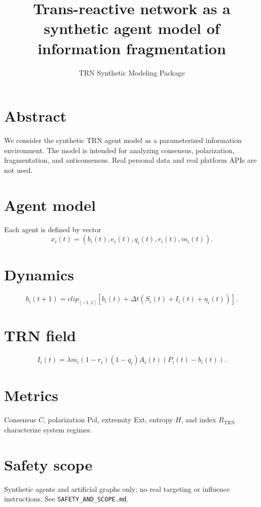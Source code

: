 \documentclass[12pt]{article}
\title{Trans-reactive network as a synthetic agent model of information fragmentation}
\author{TRN Synthetic Modeling Package}
\date{}
\begin{document}
\maketitle

\section{Abstract}
We consider the synthetic TRN agent model as a parameterized information environment. The model is intended for analyzing consensus, polarization, fragmentation, and anticonsensus. Real personal data and real platform APIs are not used.

\section{Agent model}
Each agent is defined by vector
\[
x_i(t)=(b_i(t),e_i(t),q_i(t),r_i(t),m_i(t)).
\]

\section{Dynamics}
\[
b_i(t+1)=clip_{[-1,1]}[b_i(t)+\Delta t(S_i(t)+I_i(t)+\eta_i(t))].
\]

\section{TRN field}
\[
I_i(t)=\lambda m_i(1-r_i)(1-q_i)A_i(t)(P_i(t)-b_i(t)).
\]

\section{Metrics}
Consensus $C$, polarization Pol, extremity Ext, entropy $H$, and index $R_{\mathrm{TRN}}$ characterize system regimes.

\section{Safety scope}
Synthetic agents and artificial graphs only; no real targeting or influence instructions. See \texttt{SAFETY\_AND\_SCOPE.md}.
\end{document}
